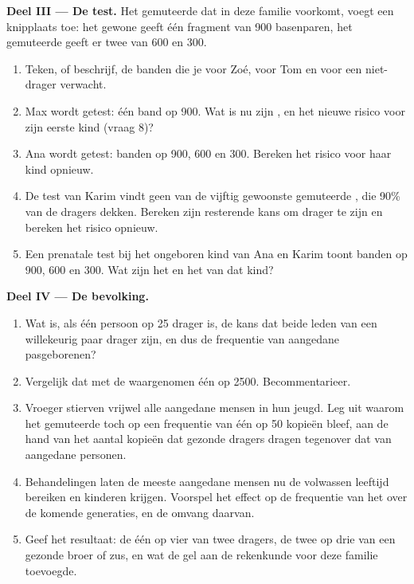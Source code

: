 \begin{problem}
\medskip
\noindent\textbf{Deel III --- De test.}
Het gemuteerde  dat in deze familie voorkomt, voegt een knipplaats
toe: het gewone  geeft één fragment van 900 basenparen, het
gemuteerde geeft er twee van 600 en 300.
\begin{enumerate}[resume]
  \item Teken, of beschrijf, de banden die je voor Zoé, voor Tom en voor
        een niet-drager verwacht.
  \item Max wordt getest: één band op 900. Wat is nu zijn , en
        het nieuwe risico voor zijn eerste kind (vraag 8)?
  \item Ana wordt getest: banden op 900, 600 en 300. Bereken het risico
        voor haar kind opnieuw.
  \item De test van Karim vindt geen van de vijftig gewoonste gemuteerde
        , die 90\% van de dragers dekken. Bereken zijn resterende
        kans om drager te zijn en bereken het risico opnieuw.
  \item Een prenatale test bij het ongeboren kind van Ana en Karim toont
        banden op 900, 600 en 300. Wat zijn het  en het 
        van dat kind?
\end{enumerate}

\medskip
\noindent\textbf{Deel IV --- De bevolking.}
\begin{enumerate}[resume]
  \item Wat is, als één persoon op 25 drager is, de kans dat beide leden
        van een willekeurig paar drager zijn, en dus de frequentie van
        aangedane pasgeborenen?
  \item Vergelijk dat met de waargenomen één op 2500. Becommentarieer.
  \item Vroeger stierven vrijwel alle aangedane mensen in hun jeugd. Leg
        uit waarom het gemuteerde  toch op een frequentie van één op
        50 kopieën bleef, aan de hand van het aantal kopieën dat gezonde
        dragers dragen tegenover dat van aangedane personen.
  \item Behandelingen laten de meeste aangedane mensen nu de volwassen
        leeftijd bereiken en kinderen krijgen. Voorspel het effect op de
        frequentie van het  over de komende generaties, en de omvang
        daarvan.
  \item Geef het resultaat: de één op vier van twee dragers, de twee op
        drie van een gezonde broer of zus, en wat de gel aan de
        rekenkunde voor deze familie toevoegde.
\end{enumerate}
\end{problem}
